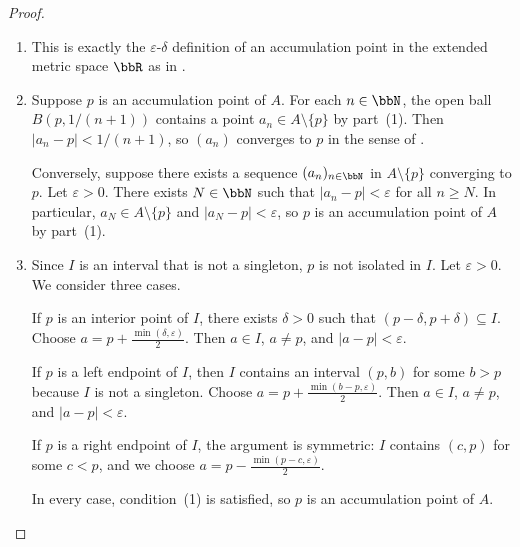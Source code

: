 \begin{proof}
    \begin{enumerate}
        \item This is exactly the $\varepsilon$-$\delta$ definition of an accumulation point in the extended metric space $\bbR$ as in .

        \item Suppose $p$ is an accumulation point of $A$. For each $n \in \bbN$, the open ball $B(p, 1/(n+1))$ contains a point $a_n \in A \setminus \{p\}$ by part~(1). Then $|a_n - p| < 1/(n+1)$, so $(a_n)$ converges to $p$ in the sense of .

        Conversely, suppose there exists a sequence $(a_n)_{n \in \bbN}$ in $A \setminus \{p\}$ converging to $p$. Let $\varepsilon > 0$. There exists $N \in \bbN$ such that $|a_n - p| < \varepsilon$ for all $n \geq N$. In particular, $a_N \in A \setminus \{p\}$ and $|a_N - p| < \varepsilon$, so $p$ is an accumulation point of $A$ by part~(1).

        \item Since $I$ is an interval that is not a singleton, $p$ is not isolated in $I$. Let $\varepsilon > 0$. We consider three cases.

        If $p$ is an interior point of $I$, there exists $\delta > 0$ such that $(p - \delta, p + \delta) \subseteq I$. Choose $a = p + \frac{\min(\delta, \varepsilon)}{2}$. Then $a \in I$, $a \neq p$, and $|a - p| < \varepsilon$.

        If $p$ is a left endpoint of $I$, then $I$ contains an interval $(p, b)$ for some $b > p$ because $I$ is not a singleton. Choose $a = p + \frac{\min(b - p, \varepsilon)}{2}$. Then $a \in I$, $a \neq p$, and $|a - p| < \varepsilon$.

        If $p$ is a right endpoint of $I$, the argument is symmetric: $I$ contains $(c, p)$ for some $c < p$, and we choose $a = p - \frac{\min(p - c, \varepsilon)}{2}$.

        In every case, condition~(1) is satisfied, so $p$ is an accumulation point of $A$.
    \end{enumerate}
\end{proof}